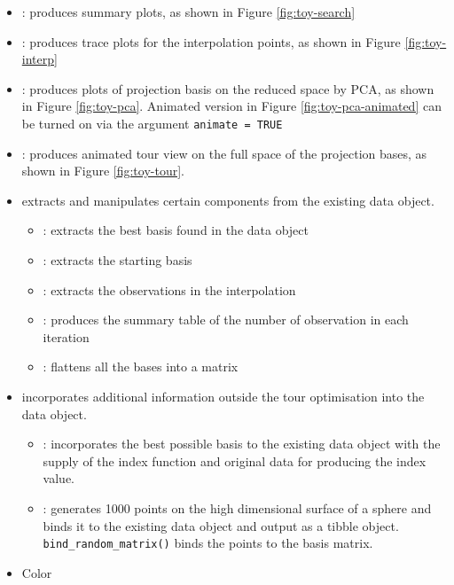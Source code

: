 \begin{itemize}
\item
  : produces summary plots, as shown in
  Figure \ref{fig:toy-search}
\item
  : produces trace plots for the
  interpolation points, as shown in Figure \ref{fig:toy-interp}
\item
  : produces plots of projection basis on
  the reduced space by PCA, as shown in Figure \ref{fig:toy-pca}.
  Animated version in Figure \ref{fig:toy-pca-animated} can be turned on
  via the argument \texttt{animate\ =\ TRUE}
\item
  : produces animated tour view on the full
  space of the projection bases, as shown in Figure \ref{fig:toy-tour}.
\item
   extracts and manipulates certain components from the
  existing data object.

  \begin{itemize}
  \tightlist
  \item
    : extracts the best basis found in the data object
  \item
    : extracts the starting basis
  \item
    : extracts the observations in the interpolation
  \item
    : produces the summary table of the
    number of observation in each iteration
  \item
    : flattens all the bases into a matrix
  \end{itemize}
\item
   incorporates additional information outside the tour
  optimisation into the data object.

  \begin{itemize}
  \tightlist
  \item
    : incorporates the best possible basis to
    the existing data object with the supply of the index function and
    original data for producing the index value.
  \item
    : generates 1000 points on the high dimensional
    surface of a sphere and binds it to the existing data object and
    output as a tibble object. \texttt{bind\_random\_matrix()} binds the
    points to the basis matrix.
  \end{itemize}
\item
  Color


\end{itemize}
